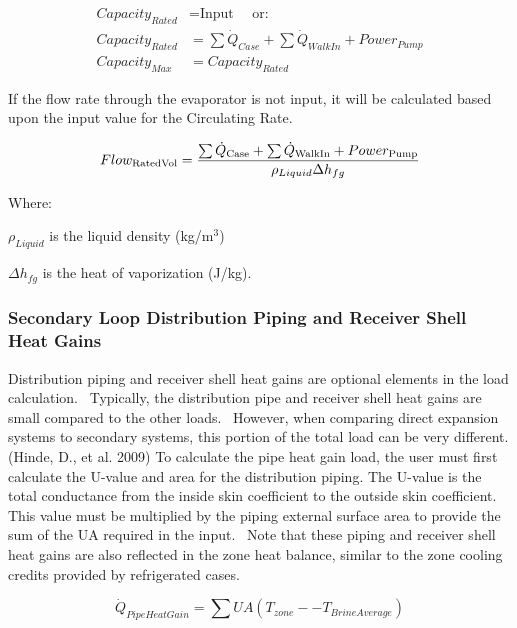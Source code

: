 \begin{equation}
  \begin{array}{rl}
    Capacity_{Rated} &= \text{Input~~~~or:} \\
    Capacity_{Rated} &= \sum \dot{Q}_{Case} + \sum \dot{Q}_{WalkIn} + Power_{Pump} \\
    Capacity_{Max}   &= Capacity_{Rated}
  \end{array}
\end{equation}

If the flow rate through the evaporator is not input, it will be calculated based upon the input value for the Circulating Rate.

\begin{equation}
Flo{w_{{\rm{RatedVol}}}} = \frac{{\sum {{{\dot Q}_{{\rm{Case}}}} + \sum {{{\dot Q}_{{\rm{WalkIn}}}} + Powe{r_{{\rm{Pump}}}}} } }}{{{\rho_{Liquid}}\Delta {h_{fg}}}}
\end{equation}

Where:

\(\rho_{Liquid}\) is the liquid density (kg/m\(^{3}\))

\(\Delta h_{fg}\) is the heat of vaporization (J/kg).

\subsubsection{Secondary Loop Distribution Piping and Receiver Shell Heat Gains}\label{secondary-loop-distribution-piping-and-receiver-shell-heat-gains}

Distribution piping and receiver shell heat gains are optional elements in the load calculation.~ Typically, the distribution pipe and receiver shell heat gains are small compared to the other loads.~ However, when comparing direct expansion systems to secondary systems, this portion of the total load can be very different. (Hinde, D., et al. 2009) To calculate the pipe heat gain load, the user must first calculate the U-value and area for the distribution piping. The U-value is the total conductance from the inside skin coefficient to the outside skin coefficient. This value must be multiplied by the piping external surface area to provide the sum of the UA required in the input.~ Note that these piping and receiver shell heat gains are also reflected in the zone heat balance, similar to the zone cooling credits provided by refrigerated cases.

\begin{equation}
{\dot Q_{PipeHeatGain}} = \sum U A (T_{zone} -- T_{BrineAverage})
\end{equation}

